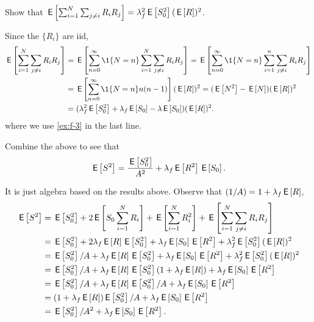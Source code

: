 \begin{exercise}\label{ex:f-88}
Show that
$\E{\sum_{i=1}^N \sum_{j\neq i} R_i R_j} = \lambda_f^2 \E{S_0^2} (\E{R})^2$.
\begin{solution}
Since the $\{R_i\}$ are iid,
 \begin{align*}
\E{\sum_{i=1}^N \sum_{j\neq i} R_i R_j}
&=\E{\sum_{n=0}^\infty \1{N=n} \sum_{i=1}^N \sum_{j\neq i} R_i R_j}
=\E{\sum_{n=0}^\infty \1{N=n} \sum_{i=1}^n \sum_{j\neq i} R_i R_j} \\
&=\E{\sum_{n=0}^\infty \1{N=n} n(n-1)} (\E{R})^2
=(\E{N^2} - \E{N}) (\E{R})^2\\
&=(\lambda_f^2 \E{S_0^2} + \lambda_f \E{S_0} - \lambda \E{S_0} ) (\E{R})^2.
 \end{align*}
where we use \cref{ex:f-3} in the last line.
\end{solution}
\end{exercise}

\begin{exercise}\label{ex:802}
 Combine
 the above to see that
 \begin{equation*}
 \E{S^2} = \frac{\E{S_0^2}}{A^2} + \lambda_f \E{R^2} \E{S_0}.
 \end{equation*}
\begin{solution}
It is just algebra based on the results above.  Observe that $(1/A) = 1+\lambda_f \E R$,
\begin{align*}
  \E{S^2}
  &= \E{S_0^2} + 2\E{S_0 \sum_{i=1}^N R_i} + \E{\sum_{i=1}^N R_i^2} + \E{\sum_{i=1}^N \sum_{j\neq i} R_i R_j} \\
  &= \E{S_0^2} + 2 \lambda_f \E R \E{S_0^2} + \lambda_f \E{S_0 }\E{R^2} +  \lambda_f^2 \E{S_0^2} (\E{R})^2 \\
  &= \E{S_0^2}/A  +  \lambda_f \E R \E{S_0^2} + \lambda_f \E{S_0 }\E{R^2} +  \lambda_f^2 \E{S_0^2} (\E{R})^2 \\
  &= \E{S_0^2}/A  +  \lambda_f \E R \E{S_0^2}(1+\lambda_f \E R)  + \lambda_f \E{S_0 }\E{R^2}\\
  &= \E{S_0^2}/A  +  \lambda_f \E R \E{S_0^2}/A + \lambda_f \E{S_0 }\E{R^2}\\
  &= (1  +  \lambda_f \E R) \E{S_0^2}/A  + \lambda_f \E{S_0 }\E{R^2}\\
  &= \E{S_0^2}/A^2  + \lambda_f \E{S_0 }\E{R^2}.
\end{align*}
\end{solution}
\end{exercise}

